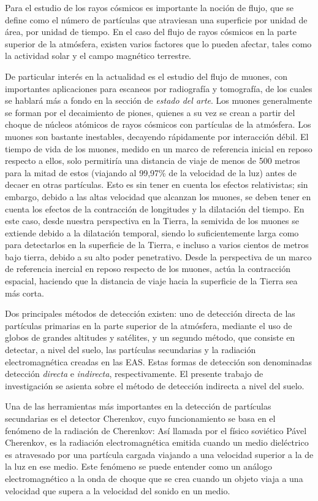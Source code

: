 \documentclass{report}
\begin{document}
Para el estudio de los rayos cósmicos es importante la noción de flujo, que se define como el número de partículas que atraviesan una superficie por unidad de área, por unidad de tiempo. En el caso del flujo de rayos cósmicos en la parte superior de la atmósfera, existen varios factores que lo pueden afectar, tales como la actividad solar y el campo magnético terrestre. \cite{PhysRevD.98.030001}

De particular interés en la actualidad es el estudio del flujo de muones, con importantes aplicaciones para escaneos por radiografía y tomografía, de los cuales se hablará más a fondo en la sección de \textit{estado del arte}. Los muones generalmente se forman por el decaimiento de piones, quienes a su vez se crean a partir del choque de núcleos atómicos de rayos cósmicos con partículas de la atmósfera. Los muones son bastante inestables, decayendo rápidamente por interacción débil. El tiempo de vida de los muones, medido en un marco de referencia inicial en reposo respecto a ellos, solo permitiría una distancia de viaje de menos de 500 metros para la mitad de estos (viajando al 99,97\% de la velocidad de la luz) antes de decaer en otras partículas. Esto es sin tener en cuenta los efectos relativistas; sin embargo, debido a las altas velocidad que alcanzan los muones, se deben tener en cuenta los efectos de la contracción de longitudes y la dilatación del tiempo. En este caso, desde nuestra perspectiva en la Tierra, la semivida de los muones se extiende debido a la dilatación temporal, siendo lo suficientemente larga como para detectarlos en la superficie de la Tierra, e incluso a varios cientos de metros bajo tierra, debido a su alto poder penetrativo. Desde la perspectiva de un marco de referencia inercial en reposo respecto de los muones, actúa la contracción espacial, haciendo que la distancia de viaje hacia la superficie de la Tierra sea más corta. \cite{HEP}

Dos principales métodos de detección existen: uno de detección directa de las partículas primarias en la parte superior de la atmósfera, mediante el uso de globos de grandes altitudes y satélites, y un segundo método, que consiste en detectar, a nivel del suelo, las partículas secundarias y la radiación electromagnética creadas en las EAS. Estas formas de detección son denominadas detección \textit{directa} e \textit{indirecta}, respectivamente. El presente trabajo de investigación se asienta sobre el método de detección indirecta a nivel del suelo.

Una de las herramientas más importantes en la detección de partículas secundarias es el detector Cherenkov, cuyo funcionamiento se basa en el fenómeno de la radiación de Cherenkov: Así llamada por el físico soviético Pável Cherenkov, es la radiación electromagnética emitida cuando un medio dieléctrico es atravesado por una partícula cargada viajando a una velocidad superior a la de la luz en ese medio. \cite{Cherenkov} Este fenómeno se puede entender como un análogo electromagnético a la onda de choque que se crea cuando un objeto viaja a una velocidad que supera a la velocidad del sonido en un medio.
\end{document}
